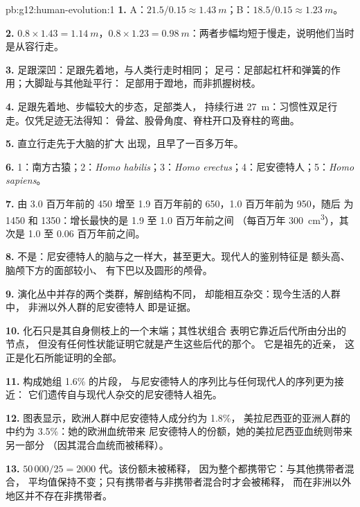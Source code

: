 \begin{solution}{pb:g12:human-evolution:1}
\textbf{1.} A：$21.5/0.15 \approx \qty{1.43}{m}$；B：$18.5/0.15
\approx \qty{1.23}{m}$。

\textbf{2.} $0.8 \times 1.43 = \qty{1.14}{m}$，$0.8 \times 1.23 =
\qty{0.98}{m}$：两者步幅均短于慢走，说明他们当时
是从容行走。

\textbf{3.} 足跟深凹：足跟先着地，与人类行走时相同；
足弓：足部起杠杆和弹簧的作用；大脚趾与其他趾平行：
足部用于蹬地，而非抓握树枝。

\textbf{4.} 足跟先着地、步幅较大的步态，足部类人，
持续行进 \qty{27}{m}：习惯性双足行走。仅凭足迹无法得知：
骨盆、股骨角度、脊柱开口及脊柱的弯曲。

\textbf{5.} 直立行走先于大脑的扩大
出现，且早了一百多万年。

\textbf{6.} 1：南方古猿；2：\emph{Homo habilis}；3：\emph{Homo
erectus}；4：尼安德特人；5：\emph{Homo sapiens}。

\textbf{7.} 由 3.0 百万年前的 450 增至 1.9 百万年前的 650，1.0 百万年前为 950，随后
为 1450 和 1350：增长最快的是 1.9 至 1.0 百万年前之间
（每百万年 \qty{300}{cm^3}），其次是 1.0 至 0.06 百万年前之间。

\textbf{8.} 不是：尼安德特人的脑与之一样大，甚至更大。现代人的鉴别特征是
额头高、脑颅下方的面部较小、
有下巴以及圆形的颅骨。

\textbf{9.} 演化丛中并存的两个类群，解剖结构不同，
却能相互杂交：现今生活的人群中，
非洲以外人群的尼安德特人  即是证据。

\textbf{10.} 化石只是其自身侧枝上的一个末端；其性状组合
表明它靠近后代所由分出的节点，
但没有任何性状能证明它就是产生这些后代的那个。
它是祖先的近亲，
这正是化石所能证明的全部。

\textbf{11.} 构成她组 1.6\% 的片段，
与尼安德特人的序列比与任何现代人的序列更为接近：
它们遗传自与现代人杂交的尼安德特人祖先。

\textbf{12.} 图表显示，欧洲人群中尼安德特人成分约为 1.8\%，
美拉尼西亚的亚洲人群的  中约为 3.5\%：她的欧洲血统带来
尼安德特人的份额，她的美拉尼西亚血统则带来另一部分
（因其混合血统而被稀释）。

\textbf{13.} $50\,000/25 = 2000$ 代。该份额未被稀释，
因为整个都携带它：与其他携带者混合，
平均值保持不变；只有携带者与非携带者混合时才会被稀释，
而在非洲以外地区并不存在非携带者。


\end{solution}

